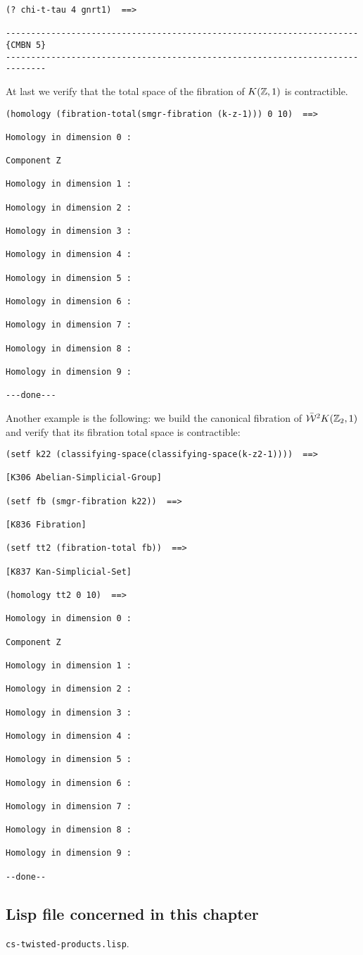 \newpage
{\footnotesize\begin{verbatim}
(? chi-t-tau 4 gnrt1)  ==>

----------------------------------------------------------------------{CMBN 5}
------------------------------------------------------------------------------
\end{verbatim}}
At last we verify that the total space of the fibration of $K({{\Bbb Z}},1)$ is
contractible.
{\footnotesize\begin{verbatim}
(homology (fibration-total(smgr-fibration (k-z-1))) 0 10)  ==>

Homology in dimension 0 :

Component Z

Homology in dimension 1 :

Homology in dimension 2 :

Homology in dimension 3 :

Homology in dimension 4 :

Homology in dimension 5 :

Homology in dimension 6 :

Homology in dimension 7 :

Homology in dimension 8 :

Homology in dimension 9 :

---done---
\end{verbatim}}
Another example is the following:
we build the canonical fibration of $\bar{\cal W}^2K({{\Bbb Z}_2}, 1)$ and verify 
that its fibration total  space is contractible:
{\footnotesize\begin{verbatim}
(setf k22 (classifying-space(classifying-space(k-z2-1))))  ==>

[K306 Abelian-Simplicial-Group]

(setf fb (smgr-fibration k22))  ==>

[K836 Fibration]

(setf tt2 (fibration-total fb))  ==>

[K837 Kan-Simplicial-Set]

(homology tt2 0 10)  ==>

Homology in dimension 0 :

Component Z

Homology in dimension 1 :

Homology in dimension 2 :

Homology in dimension 3 :

Homology in dimension 4 :

Homology in dimension 5 :

Homology in dimension 6 :

Homology in dimension 7 :

Homology in dimension 8 :

Homology in dimension 9 :

--done--
\end{verbatim}}

\subsection* {Lisp file concerned in this chapter}

{\tt cs-twisted-products.lisp}.


